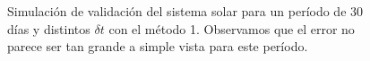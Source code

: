 \begin{figure}
{	\label{fig:ej2_m1_30_12}
	}
	\caption{
		Simulación de validación del sistema solar para un período de 30 días y distintos $\delta t$
		con el método 1.
		Observamos que el error no parece ser tan grande a simple vista para este período.
	}
	\label{ fig:res_ej2_m1_30 }
\end{figure}
